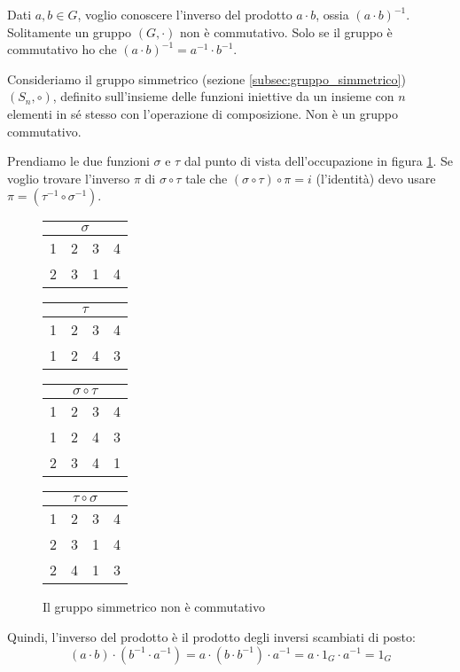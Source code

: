 Dati $a, b \in G$, voglio conoscere l'inverso del prodotto $a \cdot b$, ossia $(a \cdot b)^{-1}$. Solitamente un gruppo $(G, \cdot)$ non \`e commutativo. Solo se il gruppo \`e commutativo ho che $(a \cdot b)^{-1} = a^{-1} \cdot b^{-1}$.

Consideriamo il gruppo simmetrico (sezione \ref{subsec:gruppo_simmetrico}) $(S_n, \circ)$, definito sull'insieme delle funzioni iniettive da un insieme con $n$ elementi in s\'e stesso con l'operazione di composizione. Non \`e un gruppo commutativo.

Prendiamo le due funzioni $\sigma$ e $\tau$ dal punto di vista dell'occupazione in figura \ref{fig:gruppo_simmetrico}. Se voglio trovare l'inverso $\pi$ di $\sigma \circ \tau$ tale che $(\sigma \circ \tau) \circ \pi = i$ (l'identit\`a) devo usare $\pi = (\tau^{-1} \circ \sigma^{-1})$.

\begin{figure}[ht]
\centering
\begin{tabular}{cccc}
\multicolumn{4}{c}{$\sigma$} \\
\hline
1 & 2 & 3 & 4 \\
2 & 3 & 1 & 4
\end{tabular} \qquad
\begin{tabular}{cccc}
\multicolumn{4}{c}{$\tau$} \\
\hline
1 & 2 & 3 & 4 \\
1 & 2 & 4 & 3
\end{tabular}

\begin{tabular}{cccc}
\multicolumn{4}{c}{$\sigma \circ \tau$} \\
\hline
1 & 2 & 3 & 4 \\
1 & 2 & 4 & 3 \\
2 & 3 & 4 & 1
\end{tabular} \qquad
\begin{tabular}{cccc}
\multicolumn{4}{c}{$\tau \circ \sigma$} \\
\hline
1 & 2 & 3 & 4 \\
2 & 3 & 1 & 4 \\
2 & 4 & 1 & 3
\end{tabular}
\caption{\label{fig:gruppo_simmetrico}Il gruppo simmetrico non \`e commutativo}
\end{figure}

Quindi, l'inverso del prodotto \`e il prodotto degli inversi scambiati di posto:
\[
(a \cdot b) \cdot (b^{-1} \cdot a^{-1}) = a \cdot (b \cdot b^{-1}) 
\cdot a^{-1} = a \cdot 1_G \cdot a^{-1} = 1_G
\]

